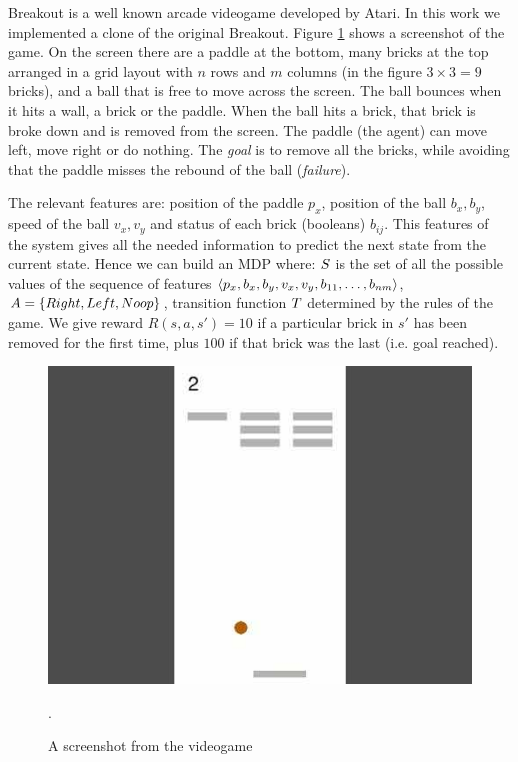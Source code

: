 \begin{example}\label{exa:breakout}
	Breakout is a well known arcade videogame developed by Atari. In this work we implemented a clone of the original Breakout. Figure \ref{fig:breakout} shows a screenshot of the game. On the screen there are a paddle at the bottom, many bricks at the top arranged in a grid layout with $n$ rows and $m$ columns (in the figure $3\times 3 = 9$ bricks), and a ball that is free to move across the screen. The ball bounces when it hits a wall, a brick or the paddle. When the ball hits a brick, that brick is broke down and is removed from the screen. The paddle (the agent) can move left, move right or do nothing. The \emph{goal} is to remove all the bricks, while avoiding that the paddle misses the rebound of the ball (\emph{failure}).
	
	The relevant features are: position of the paddle $p_x$, position of the ball $b_x, b_y$, speed of the ball $v_x, v_y$ and status of each brick (booleans) $b_{ij}$. This features of the system gives all the needed information to predict the next state from the current state. Hence we can build an MDP where: $S$ is the set of  all the possible values of the sequence of features $\langle p_x, b_x, b_y, v_x, v_y, b_{11}, \dots, b_{nm} \rangle$, $A = \{Right, Left, No\-op\}$, transition function $T$ determined by the rules of the game. We give reward $R(s,a,s')=10$ if a particular brick in $s'$ has been removed for the first time, plus $100$ if that brick was the last (i.e. goal reached).
	\begin{figure}[h]
		\centering
		\includegraphics[width=.6\linewidth]{images/breakout.jpg}
		\caption{A screenshot from the videogame \Breakout}\label{fig:breakout}. 
	\end{figure}

\end{example}
